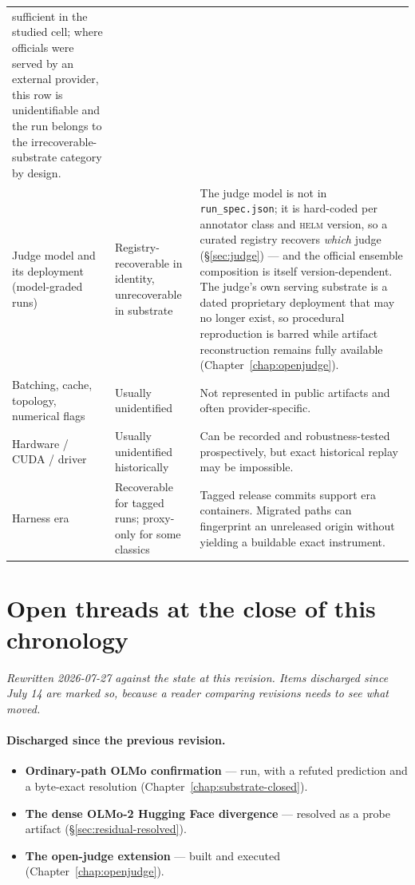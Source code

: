 \documentclass[11pt]{report}
\newcommand{\file}[1]{\texttt{#1}}
\begin{document}
\begin{longtable}{@{}p{}p{}p{}@{}}
sufficient in the studied cell; where officials were served by an external provider,
this row is unidentifiable and the run belongs to the irrecoverable-substrate
category by design. \\
Judge model and its deployment (model-graded runs) & Registry-recoverable in
identity, unrecoverable in substrate & The judge model is not in
\file{run\_spec.json}; it is hard-coded per annotator class and \textsc{helm}
version, so a curated registry recovers \emph{which} judge
(\S\ref{sec:judge}) --- and the official ensemble composition is itself
version-dependent. The judge's own serving substrate is a dated proprietary
deployment that may no longer exist, so procedural reproduction is barred while
artifact reconstruction remains fully available (Chapter~\ref{chap:openjudge}). \\
Batching, cache, topology, numerical flags & Usually unidentified & Not represented
in public artifacts and often provider-specific. \\
Hardware / CUDA / driver & Usually unidentified historically & Can be recorded and
robustness-tested prospectively, but exact historical replay may be impossible. \\
Harness era & Recoverable for tagged runs; proxy-only for some classics & Tagged
release commits support era containers. Migrated paths can fingerprint an unreleased
origin without yielding a buildable exact instrument. \\
\bottomrule
\end{longtable}

\section{Open threads at the close of this chronology}
\label{sec:open-threads}

\emph{Rewritten 2026-07-27 against the state at this revision. Items discharged since
July 14 are marked so, because a reader comparing revisions needs to see what moved.}

\paragraph{Discharged since the previous revision.}
\begin{itemize}[nosep]
  \item \textbf{Ordinary-path OLMo confirmation} --- run, with a refuted prediction
        and a byte-exact resolution (Chapter~\ref{chap:substrate-closed}).
  \item \textbf{The dense OLMo-2 Hugging Face divergence} --- resolved as a probe
        artifact (\S\ref{sec:residual-resolved}).
  \item \textbf{The open-judge extension} --- built and executed
        (Chapter~\ref{chap:openjudge}).
\end{itemize}
\end{document}
